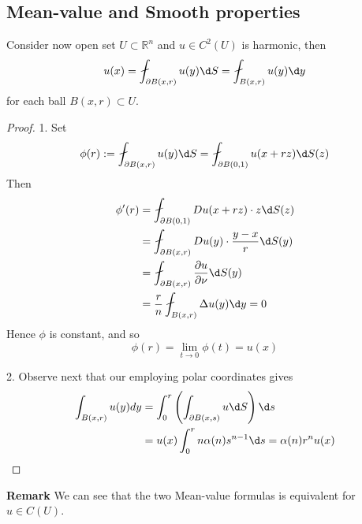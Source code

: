 \subsection{Mean-value and Smooth properties}
\begin{theorem}
    Consider now open set $U \subset \mathbb{R}^n$ and $u \in C^2(U)$
    is harmonic, then
    \begin{equation*}
        u(x)=\fint_{\partial B(x, r)} u(y)\d S =\fint_{B(x, r)} u(y) \d y
    \end{equation*}
    for each ball $B(x, r) \subset U$.
    \begin{proof}
        1. Set
        \begin{equation*}
            \phi(r)
            :=
            \fint_{\partial B(x, r)} u(y) \d S
            =
            \fint_{\partial B(0, 1)} u(x+rz) \d S(z)
        \end{equation*}
        Then
        \begin{equation*}
            \begin{aligned}
                \phi^{\prime}(r) & =\fint_{\partial B(0, 1)} Du(x+rz)\cdot z \d S(z)                   \\
                                 & = \fint_{\partial B(x, r)} Du(y) \cdot \frac{y-x}{r} \d S(y)        \\
                                 & = \fint_{\partial B(x, r)}  \frac{\partial u}{\partial \nu} \d S(y) \\
                                 & = \frac{r}{n} \fint_{ B(x, r)}  \Delta u(y) \d y=0
            \end{aligned}
        \end{equation*}
        Hence $\phi$ is constant, and so
        \begin{equation*}
            \phi(r)=\lim _{t \rightarrow 0} \phi(t)= u(x)
        \end{equation*}

        2. Observe next that our employing polar coordinates gives
        \begin{equation*}
            \begin{aligned}
                \int_{B(x, r)} u(y) d y & =\int_0^r\left(\int_{\partial B(x, s)} u \d S\right) \d s  \\
                                        & =u(x) \int_0^r n \alpha(n) s^{n-1} \d s=\alpha(n) r^n u(x)
            \end{aligned}
        \end{equation*}
    \end{proof}
    \textbf{Remark} We can see that the two Mean-value formulas is equivalent for $u\in C(U)$.
\end{theorem}
